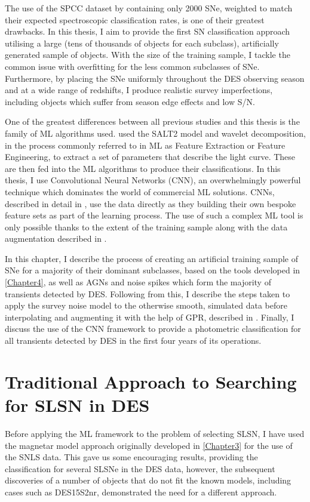 The use of the SPCC dataset by \citet{Lochner2016} containing only 2000 SNe, weighted to match their expected spectroscopic classification rates, is one of their greatest drawbacks. In this thesis, I aim to provide the first SN classification approach utilising a large (tens of thousands of objects for each subclass), artificially generated sample of objects. With the size of the training sample, I tackle the common issue with overfitting for the less common subclasses of SNe. Furthermore, by placing the SNe uniformly throughout the DES observing season and at a wide range of redshifts, I produce realistic survey imperfections, including objects which suffer from season edge effects and low S/N.

One of the greatest differences between all previous studies and this thesis is the family of ML algorithms used. \citet{Lochner2016} used the SALT2 model and wavelet decomposition, in the process commonly referred to in ML as Feature Extraction or Feature Engineering, to extract a set of parameters that describe the light curve. These are then fed into the ML algorithms to produce their classifications. In this thesis, I use Convolutional Neural Networks (CNN), an overwhelmingly powerful technique which dominates the world of commercial ML solutions. CNNs, described in detail in , use the data directly as they building their own bespoke feature sets as part of the learning process. The use of such a complex ML tool is only possible thanks to the extent of the training sample along with the data augmentation described in .

In this chapter, I describe the process of creating an artificial training sample of SNe for a majority of their dominant subclasses, based on the tools developed in \cref{Chapter4}, as well as AGNs and noise spikes which form the majority of transients detected by DES. Following from this, I describe the steps taken to apply the survey noise model to the otherwise smooth, simulated data before interpolating and augmenting it with the help of GPR, described in . Finally, I discuss the use of the CNN framework to provide a photometric classification for all transients detected by DES in the first four years of its operations.

\section{Traditional Approach to Searching for SLSN in DES}
Before applying the ML framework to the problem of selecting SLSN, I have used the magnetar model approach originally developed in \cref{Chapter3} for the use of the SNLS data. This gave us some encouraging results, providing the classification for several SLSNe in the DES data, however, the subsequent discoveries of a number of objects that do not fit the known models, including cases such as DES15S2nr, demonstrated the need for a different approach.

